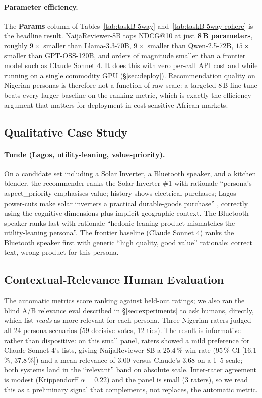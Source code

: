 \documentclass[sigconf,nonacm,balance]{acmart}
\begin{document}
\paragraph{Parameter efficiency.} The \textbf{Params} column of
Tables~\ref{tab:taskB-5way} and~\ref{tab:taskB-5way-cohere} is the headline
result. NaijaReviewer-8B tops NDCG@10 at just \textbf{8\,B parameters},
roughly $9\times$ smaller than Llama-3.3-70B, $9\times$ smaller than
Qwen-2.5-72B, $15\times$ smaller than GPT-OSS-120B, and orders of magnitude
smaller than a frontier model such as Claude Sonnet 4. It does this with zero
per-call API cost and while running on a single commodity GPU
(\S\ref{sec:deploy}). Recommendation quality on Nigerian personas is therefore
not a function of raw scale: a targeted 8\,B fine-tune beats every larger
baseline on the ranking metric, which is exactly the efficiency argument that
matters for deployment in cost-sensitive African markets.

\subsection{Qualitative Case Study}

\paragraph{Tunde (Lagos, utility-leaning, value-priority).}
On a candidate set including a Solar Inverter, a Bluetooth speaker, and
a kitchen blender, the recommender ranks the Solar Inverter \#1 with
rationale ``persona's \textsf{aspect\_priority} emphasises value; history
shows electrical purchases; Lagos power-cuts make solar inverters a
practical durable-goods purchase'' , correctly using the cognitive
dimensions plus implicit geographic context. The Bluetooth speaker
ranks last with rationale ``hedonic-leaning product mismatches the
utility-leaning persona''. The frontier baseline (Claude Sonnet 4)
ranks the Bluetooth speaker first with generic ``high quality, good
value'' rationale: correct text, wrong product for this persona.

\subsection{Contextual-Relevance Human Evaluation}
\label{sec:taskb-humaneval}
The automatic metrics score ranking against held-out ratings; we also ran the
blind A/B relevance eval described in \S\ref{sec:experiments} to ask humans,
directly, which list \emph{reads} as more relevant for each persona. Three
Nigerian raters judged all 24 persona scenarios (59 decisive votes, 12 ties).
The result is informative rather than dispositive: on this small panel,
raters showed a mild preference for Claude Sonnet 4's lists, giving
NaijaReviewer-8B a 25.4\,\% win-rate (95\,\% CI [16.1\,\%, 37.8\,\%]) and a
mean relevance of 3.00 versus Claude's 3.68 on a 1--5 scale; both systems land
in the ``relevant'' band on absolute scale. Inter-rater agreement is modest
(Krippendorff $\alpha = 0.22$) and the panel is small (3 raters), so we read
this as a preliminary signal that complements, not replaces, the automatic
metric.
\end{document}
